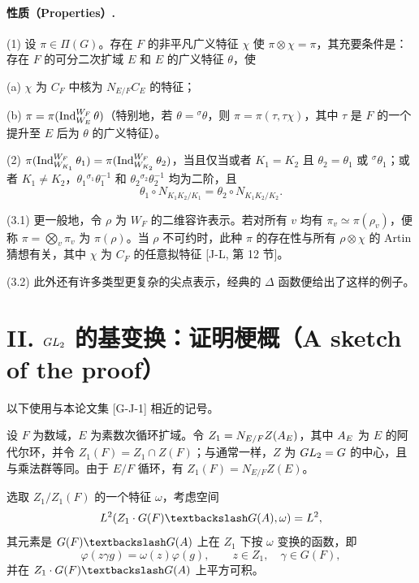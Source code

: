 \paragraph*{性质（Properties）.}
(1) 设 $\pi\in\Pi(G)$。存在 $F$ 的非平凡广义特征 $\chi$ 使 $\pi\otimes\chi=\pi$，其充要条件是：存在 $F$ 的可分二次扩域 $E$ 和 $E$ 的广义特征 $\theta$，使

(a) $\chi$ 为 $C_F$ 中核为 $N_{E/F}C_E$ 的特征；

(b) $\pi=\pi(\operatorname{Ind}_{W_E}^{W_F}\theta)$（特别地，若 $\theta={}^\sigma\theta$，则 $\pi=\pi(\tau,\tau\chi)$，其中 $\tau$ 是 $F$ 的一个提升至 $E$ 后为 $\theta$ 的广义特征）。

(2) $\pi(\operatorname{Ind}_{W_{K_1}}^{W_F}\theta_1)=\pi(\operatorname{Ind}_{W_{K_2}}^{W_F}\theta_2)$，当且仅当或者 $K_1=K_2$ 且 $\theta_2=\theta_1$ 或 ${}^\sigma\theta_1$；或者 $K_1\ne K_2$，$\theta_1{}^{\sigma_1}\theta_1^{-1}$ 和 $\theta_2{}^{\sigma_2}\theta_2^{-1}$ 均为二阶，且
\[
 \theta_1\circ N_{K_1K_2/K_1}=\theta_2\circ N_{K_1K_2/K_2}.
\]

(3.1) 更一般地，令 $\rho$ 为 $W_F$ 的二维容许表示。若对所有 $v$ 均有 $\pi_v\simeq\pi(\rho_v)$，便称 $\pi=\bigotimes_v\pi_v$ 为 $\pi(\rho)$。当 $\rho$ 不可约时，此种 $\pi$ 的存在性与所有 $\rho\otimes\chi$ 的 Artin 猜想有关，其中 $\chi$ 为 $C_F$ 的任意拟特征 [J-L, 第 12 节]。

(3.2) 此外还有许多类型更复杂的尖点表示，经典的 $\Delta$ 函数便给出了这样的例子。

\section*{II. $GL_2$ 的基变换：证明梗概（A sketch of the proof）}
以下使用与本论文集 [G-J-1] 相近的记号。

设 $F$ 为数域，$E$ 为素数次循环扩域。令 $Z_1=N_{E/F}Z(A_E)$，其中 $A_E$ 为 $E$ 的阿代尔环，并令 $Z_1(F)=Z_1\cap Z(F)$；与通常一样，$Z$ 为 $GL_2=G$ 的中心，且与乘法群等同。由于 $E/F$ 循环，有 $Z_1(F)=N_{E/F}Z(E)$。

选取 $Z_1/Z_1(F)$ 的一个特征 $\omega$，考虑空间
\[
 L^2(Z_1\cdot G(F)\backslash G(\A),\omega)=L^2,
\]
其元素是 $G(F)\backslash G(\A)$ 上在 $Z_1$ 下按 $\omega$ 变换的函数，即
\[
 \varphi(z\gamma g)=\omega(z)\varphi(g),\qquad z\in Z_1,\quad\gamma\in G(F),
\]
并在 $Z_1\cdot G(F)\backslash G(\A)$ 上平方可积。

